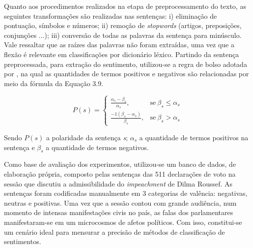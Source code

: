 \documentclass[
12pt,				%
openright,			%
twoside,			%
a4paper,			%
english,			%
french,				%
spanish,			%
brazil				%
]{abntex2}
\begin{document}
Quanto aos procedimentos realizados na etapa de preprocessamento do texto, as seguintes transformações são realizadas nas sentenças: i) eliminação de pontuação, símbolos e números; ii) remoção de \emph{stopwords} (artigos, preposições, conjunções ...); iii) conversão de todas as palavras da sentença para minúsculo. Vale ressaltar que as raízes das palavras não foram extraídas, uma vez que a flexão é relevante em classificações por dicionário léxico. Partindo da sentença preprocessada, para extração do sentimento, utilizou-se a regra de bolso adotada por , na qual as quantidades de termos positivos e negativos são relacionadas por meio da fórmula da Equação 3.9.

\begin{equation}
P(s) = 
\begin{cases}
\frac{\alpha_s - \beta_s}{\alpha_s}, & \text{se}\ \beta_s \leq \alpha_s \\
\frac{-1(\beta_s - \alpha_s)}{\beta_s}, & \text{se}\ \beta_s > \alpha_s
\end{cases}
\end{equation}

Sendo $P(s)$ a polaridade da sentença \emph{s}; $\alpha_s$ a quantidade de termos positivos na sentença e  $\beta_s$ a quantidade de termos negativos.

Como base de avaliação dos experimentos, utilizou-se um banco de dados, de elaboração própria, composto pelas sentenças das 511 declarações de voto na sessão que discutiu a admissibilidade do \emph{impeachment} de Dilma Roussef. As sentenças foram codificadas manualmente em 3 categorias de valência: negativas, neutras e positivas. Uma vez que a sessão contou com grande audiência, num momento de intensas manifestações civis no país, as falas dos parlamentares manifestaram-se em um microcosmos de afetos políticos. Com isso, constitui-se um cenário ideal para mensurar a precisão de métodos de classificação de sentimentos.   
\end{document}
